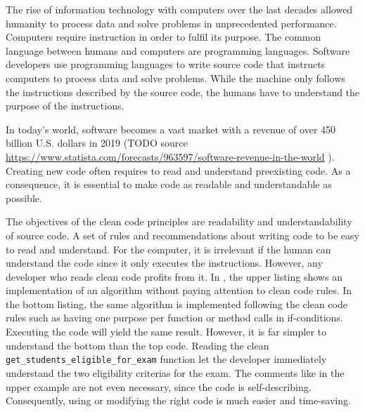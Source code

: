 The rise of information technology with computers over the last decades allowed humanity to process data and solve problems in unprecedented performance. Computers require instruction in order to fulfil its purpose. The common language between humans and computers are programming languages. Software developers use programming languages to write source code that instructs computers to process data and solve problems. While the machine only follows the instructions described by the source code, the humans have to understand the purpose of the instructions. 

In today's world, software becomes a vast market with a revenue of over 450 billion U.S. dollars in 2019 (TODO source \url{https://www.statista.com/forecasts/963597/software-revenue-in-the-world} ). Creating new code often requires to read and understand preexisting code. As a consequence, it is essential to make code as readable and understandable as possible. 

The objectives of the clean code principles are readability and understandability of source code. A set of rules and recommendations about writing code to be easy to read and understand. For the computer, it is irrelevant if the human can understand the code since it only executes the instructions. However, any developer who reads clean code profits from it. In , the upper listing shows an implementation of an algorithm without paying attention to clean code rules. In the bottom listing, the same algorithm is implemented following the clean code rules such as having one purpose per function or method calls in if-conditions. Executing the code will yield the same result. However, it is far simpler to understand the bottom than the top code. Reading the clean \texttt{get\_students\_eligible\_for\_exam} function let the developer immediately understand the two eligibility criterias for the exam. The comments like in the upper example are not even necessary, since the code is self-describing.
Consequently, using or modifying the right code is much easier and time-saving.

